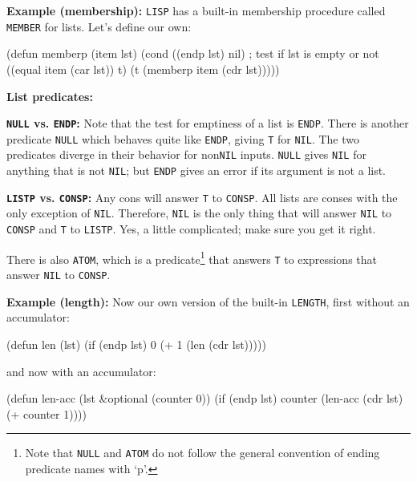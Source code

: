 \documentclass[a4paper,11pt]{article}
\begin{document}
\begin{uenum}

\item {\bf Example (membership):} \Verb+LISP+ has a built-in membership procedure called \Verb+MEMBER+ for lists. Let's define our own:

\begin{lispcode}
(defun memberp (item lst)
  (cond ((endp lst) nil) ; test if lst is empty or not
        ((equal item (car lst)) t)
        (t (memberp item (cdr lst)))))
\end{lispcode}

\item {\bf List predicates:}
\begin{uenumi}
\item {\bf \Verb+NULL+ vs. \Verb+ENDP+:}
Note that the test for emptiness of a list is \Verb+ENDP+. There is another predicate \Verb+NULL+ which behaves quite like \Verb+ENDP+, giving \Verb+T+ for \Verb+NIL+. The two predicates diverge in their behavior for non\Verb+NIL+ inputs. \Verb+NULL+ gives \Verb+NIL+ for anything that is not \Verb+NIL+; but \Verb+ENDP+ gives an error if its argument is not a list. 

\item {\bf \Verb+LISTP+ vs. \Verb+CONSP+:} Any cons will answer \Verb+T+ to \Verb+CONSP+. All lists are conses with the only exception of \Verb+NIL+. Therefore, \Verb+NIL+  is the only thing that will answer \Verb+NIL+ to \Verb+CONSP+ and \Verb+T+ to \Verb+LISTP+. Yes, a little complicated; make sure you get it right.

There is also \Verb+ATOM+, which is a predicate\footnote{Note that \Verb+NULL+ and \Verb+ATOM+ do not follow the general convention of ending predicate names with `p'.} that answers \Verb+T+ to expressions that answer \Verb+NIL+ to \Verb+CONSP+. 
\end{uenumi}

\item {\bf Example (length):} Now our own version of the built-in \Verb+LENGTH+, first without an accumulator:

\begin{lispcode}
(defun len (lst)
  (if (endp lst)
    0
    (+ 1 (len (cdr lst)))))
\end{lispcode}

and now with an accumulator:

\begin{lispcode}
(defun len-acc (lst &optional (counter 0))
  (if (endp lst)
    counter
    (len-acc (cdr lst) (+ counter 1))))
\end{lispcode}


\end{uenum}
\end{document}
